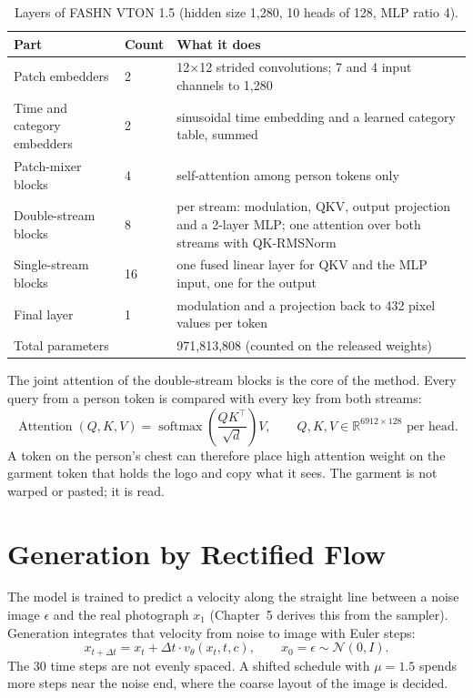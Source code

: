 \begin{table}[!htbp]
\centering
\caption{Layers of FASHN VTON 1.5 (hidden size 1{,}280, 10 heads of 128, MLP ratio 4).}
\label{tab:layers}
\small
\begin{tabularx}{\linewidth}{@{}L{38mm}L{12mm}Y@{}}
\toprule
\textbf{Part} & \textbf{Count} & \textbf{What it does}\\
\midrule
Patch embedders & 2 & 12$\times$12 strided convolutions; 7 and 4 input channels to 1{,}280\\
Time and category embedders & 2 & sinusoidal time embedding and a learned category table, summed\\
Patch-mixer blocks & 4 & self-attention among person tokens only\\
Double-stream blocks & 8 & per stream: modulation, QKV, output projection and a 2-layer MLP; one attention over both streams with QK-RMSNorm\\
Single-stream blocks & 16 & one fused linear layer for QKV and the MLP input, one for the output\\
Final layer & 1 & modulation and a projection back to 432 pixel values per token\\
\midrule
Total parameters & & 971{,}813{,}808 (counted on the released weights)\\
\bottomrule
\end{tabularx}
\end{table}

The joint attention of the double-stream blocks is the core of the method. Every query from a person token is compared with every key from both streams:
\begin{equation}
\operatorname{Attention}(Q, K, V) = \operatorname{softmax}\!\left(\frac{QK^\top}{\sqrt{d}}\right) V, \qquad Q, K, V \in \mathbb{R}^{6912 \times 128} \text{ per head}.
\end{equation}
A token on the person's chest can therefore place high attention weight on the garment token that holds the logo and copy what it sees. The garment is not warped or pasted; it is read.

\section{Generation by Rectified Flow}

The model is trained to predict a velocity along the straight line between a noise image $\epsilon$ and the real photograph $x_1$ (Chapter~5 derives this from the sampler). Generation integrates that velocity from noise to image with Euler steps:
\begin{equation}
x_{t+\Delta t} = x_t + \Delta t \cdot v_\theta(x_t, t, c), \qquad x_0 = \epsilon \sim \mathcal{N}(0, I).
\end{equation}
The 30 time steps are not evenly spaced. A shifted schedule with $\mu = 1.5$ spends more steps near the noise end, where the coarse layout of the image is decided.

